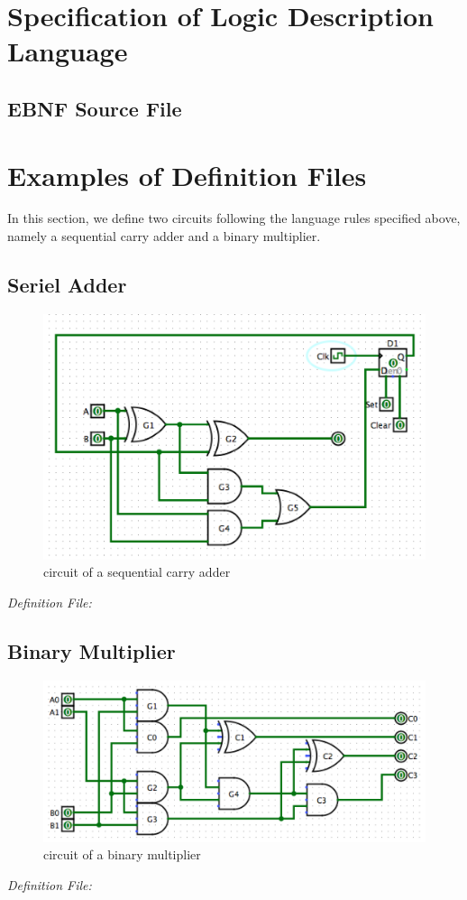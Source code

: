 \documentclass[12pt]{article}
\begin{document}
\section{Specification of Logic Description Language}

\subsection{EBNF Source File}



\section{Examples of Definition Files}
In this section, we define two circuits following the language rules specified above, namely a sequential carry adder and a binary multiplier.

\subsection{Seriel Adder}
\begin{figure}[H]
    \centering
    \includegraphics[scale=0.6]{sequential_carry_adder.png}
    \caption{circuit of a sequential carry adder}
\end{figure}

\emph{Definition File:}



\subsection{Binary Multiplier}
\begin{figure}[H]
    \centering
    \includegraphics[scale=0.6]{bin_multiplier.png}
    \caption{circuit of a binary multiplier}
\end{figure}
\emph{Definition File:}

\end{document}
